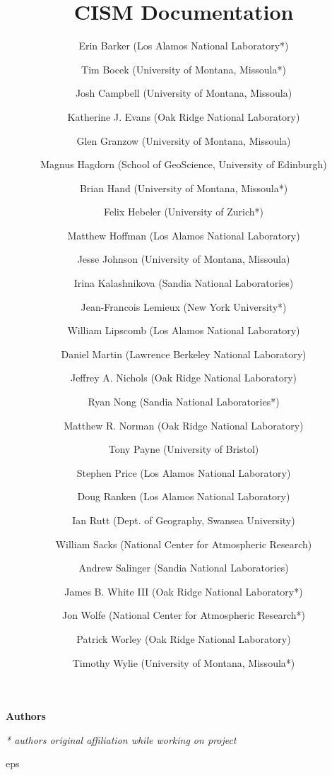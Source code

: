 

\frontmatter

\title{CISM {\glimmerver} Documentation}
\maketitle

\begin{center}
\textbf{\Large Authors}
\end{center}

\author{Erin Barker (Los Alamos National Laboratory*)}
\author{Tim Bocek  (University of Montana, Missoula*)}
\author{Josh Campbell  (University of Montana, Missoula)}
\author{Katherine J. Evans (Oak Ridge National Laboratory)}
\author{Glen Granzow (University of Montana, Missoula)}
\author{Magnus Hagdorn (School of GeoScience, University of Edinburgh)}
\author{Brian Hand (University of Montana, Missoula*)}
\author{Felix Hebeler (University of Zurich*)}
\author{Matthew Hoffman (Los Alamos National Laboratory)}
\author{Jesse Johnson (University of Montana, Missoula)}
\author{Irina Kalashnikova (Sandia National Laboratories)}
\author{Jean-Francois Lemieux (New York University*)}
\author{William Lipscomb (Los Alamos National Laboratory)}
\author{Daniel Martin (Lawrence Berkeley National Laboratory)}
\author{Jeffrey A. Nichols (Oak Ridge National Laboratory)}
\author{Ryan Nong (Sandia National Laboratories*)}
\author{Matthew R. Norman (Oak Ridge National Laboratory)}
\author{Tony Payne (University of Bristol)}
\author{Stephen Price (Los Alamos National Laboratory)}
\author{Doug Ranken (Los Alamos National Laboratory)}
\author{Ian Rutt (Dept. of Geography, Swansea University)}
\author{William Sacks (National Center for Atmospheric Research)}
\author{Andrew Salinger (Sandia National Laboratories)}
\author{James B. White III (Oak Ridge National Laboratory*)}
\author{Jon Wolfe (National Center for Atmospheric Research*)}
\author{Patrick Worley (Oak Ridge National Laboratory)}
\author{Timothy Wylie (University of Montana, Missoula*)}

\textit{* authors original affiliation while working on project}


\tableofcontents

{
         {eps} 
         {%
         } 

}
{}

